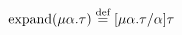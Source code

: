 \documentclass{article}
\newcommand{\rectype}[2]{\mu #1.#2}
\newcommand{\subst}[3]{[#1 / #2]#3}
\newcommand{\defeq}{\stackrel{\text{def}}{=}}
\DeclareMathOperator{\expand}{\text{\normalfont expand}}
\begin{document}
$\expand(\rectype{\alpha}{\tau}) \defeq \subst{\rectype{\alpha}{\tau}}{\alpha}{\tau}$

\vspace*{\baselineskip}




\end{document}
